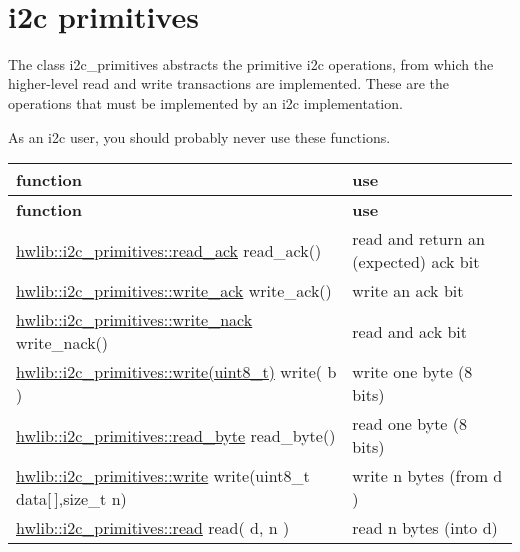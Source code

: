 ~\newline
 

\hypertarget{i2c_i2c-primitives}{}\section{i2c primitives}\label{i2c_i2c-primitives}
The class i2c\+\_\+primitives abstracts the primitive i2c operations, from which the higher-\/level read and write transactions are implemented. These are the operations that must be implemented by an i2c implementation.

As an i2c user, you should probably never use these functions.

\tabulinesep=1mm
\begin{longtabu} spread 0pt [c]{*{2}{|X[-1]}|}
\hline
\rowcolor{\tableheadbgcolor}\textbf{ function }&\textbf{ use  }\\
\endfirsthead
\hline
\endfoot
\hline
\rowcolor{\tableheadbgcolor}\textbf{ function }&\textbf{ use  }\\
\endhead
\hyperlink{classhwlib_1_1i2c__primitives_adfa6c493163d397f58a3e2ba4617dbac}{hwlib\+::i2c\+\_\+primitives\+::read\+\_\+ack} read\+\_\+ack() &read and return an (expected) ack bit \\
\hyperlink{classhwlib_1_1i2c__primitives_a711df86e5129b7daeff7a622b7b734c6}{hwlib\+::i2c\+\_\+primitives\+::write\+\_\+ack} write\+\_\+ack() &write an ack bit \\
\hyperlink{classhwlib_1_1i2c__primitives_a5ca312553bc0817ffecf5f90caf96396}{hwlib\+::i2c\+\_\+primitives\+::write\+\_\+nack} write\+\_\+nack() &read and ack bit \\
\hyperlink{classhwlib_1_1i2c__primitives_aa5227ae39d6dd5957cf47b0b761b475b}{hwlib\+::i2c\+\_\+primitives\+::write(uint8\+\_\+t)} write( b ) &write one byte (8 bits) \\
\hyperlink{classhwlib_1_1i2c__primitives_a21c9843d3a7801781e576013a1e154f9}{hwlib\+::i2c\+\_\+primitives\+::read\+\_\+byte} read\+\_\+byte() &read one byte (8 bits) \\
\hyperlink{classhwlib_1_1i2c__primitives_aa5227ae39d6dd5957cf47b0b761b475b}{hwlib\+::i2c\+\_\+primitives\+::write} write(uint8\+\_\+t data\mbox{[}$\,$\mbox{]},size\+\_\+t n) &write n bytes (from d ) \\
\hyperlink{classhwlib_1_1i2c__primitives_a2a8cc988531ea774d39d726f213f8585}{hwlib\+::i2c\+\_\+primitives\+::read} read( d, n ) &read n bytes (into d) \\
\end{longtabu}


~\newline
 
